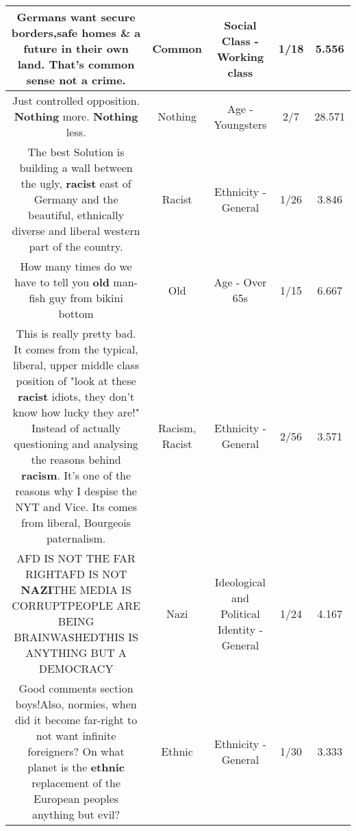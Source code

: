 \documentclass[11pt]{article}
\newlength\mylength
\begin{document}
\begin{center}
\begin{longtable}{|C{.65\mylength}|C{.30\mylength}|C{.12\mylength}|C{.12\mylength}|C{.12\mylength}|}
  \small Germans want secure borders,safe homes \& a future in their own land. That's \textbf{common} sense not a crime.\normalsize   & Common & Social Class - Working class & 1/18 & 5.556 \\  \hline
  \small Just controlled opposition. \textbf{Nothing} more. \textbf{Nothing} less.\normalsize   & Nothing & Age - Youngsters & 2/7 & 28.571 \\  \hline
  \small The best Solution is building a wall between the ugly, \textbf{racist} east of Germany and the beautiful, ethnically diverse and liberal western part of the country.\normalsize   & Racist & Ethnicity - General & 1/26 & 3.846 \\  \hline
  \small How many times do we have to tell you \textbf{old} man-fish guy from bikini bottom\normalsize   & Old & Age - Over 65s & 1/15 & 6.667 \\  \hline
  \small This is really pretty bad. It comes from the typical, liberal, upper middle class position of "look at these \textbf{racist} idiots, they don't know how lucky they are!" Instead of actually questioning and analysing the reasons behind \textbf{racism}. It's one of the reasons why I despise the NYT and Vice. Its comes from liberal, Bourgeois paternalism.\normalsize   & Racism, Racist & Ethnicity - General & 2/56 & 3.571 \\  \hline
  \small AFD IS NOT THE FAR RIGHTAFD IS NOT \textbf{NAZI}THE MEDIA IS CORRUPTPEOPLE ARE BEING BRAINWASHEDTHIS IS ANYTHING BUT A DEMOCRACY\normalsize   & Nazi &  Ideological and Political Identity - General & 1/24 & 4.167 \\  \hline
  \small Good comments section boys!Also, normies, when did it become far-right to not want infinite foreigners? On what planet is the \textbf{ethnic} replacement of the European peoples anything but evil?\normalsize   & Ethnic & Ethnicity - General & 1/30 & 3.333 \\  \hline

\end{longtable}
\end{center}
\end{document}
